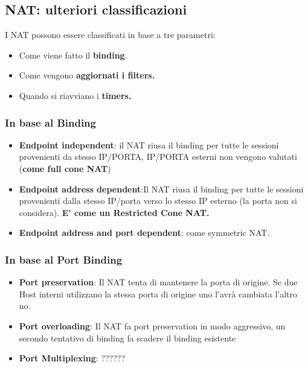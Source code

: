 \documentclass[12pt]{article}
\begin{document}
		\subsection{NAT: ulteriori classificazioni}
			I NAT possono essere classificati in base a tre parametri:
			\begin{itemize}
				\item Come viene fatto il \textbf{binding}.
				\item Come vengono \textbf{aggiornati i filters.}
				\item Quando si riavviano i \textbf{timers.}
			\end{itemize}
			\subsubsection{In base al Binding}
				\begin{itemize}
					\item \textbf{Endpoint independent}: il NAT riusa il binding per tutte le sessioni provenienti da stesso IP/PORTA, IP/PORTA esterni non vengono valutati (\textbf{come full cone NAT})
					\item \textbf{Endpoint address dependent}:Il NAT riusa il binding per tutte le sessioni provenienti dalla stesso IP/porta verso lo stesso IP esterno (la porta non si considera).
					\textbf{E’ come un Restricted Cone NAT.}
					\item \textbf{Endpoint address and port dependent}: come symmetric NAT.  	
				\end{itemize}
			\subsubsection{In base al Port Binding}
				\begin{itemize}
					\item \textbf{Port preservation}: Il NAT tenta di mantenere la porta di origine. Se due Host interni utilizzano la stessa porta di origine uno l'avrà cambiata l'altro no.
					\item \textbf{Port overloading}: Il NAT fa port preservation in modo aggressivo, un secondo tentativo di binding fa scadere il binding esistente
					\item \textbf{Port Multiplexing}: ??????
				\end{itemize}
\end{document}
